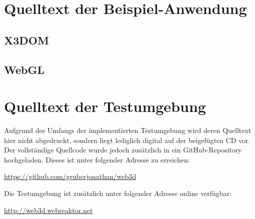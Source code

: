 \chapter{Quelltext der Beispiel-Anwendung}

\section{X3DOM}
\label{APPENDIX:X3DOM_EXAMPLE}

\section{WebGL}
\label{APPENDIX:WEBGL_EXAMPLE}

\chapter{Quelltext der Testumgebung}

Aufgrund des Umfangs der implementierten Testumgebung wird deren Quelltext hier nicht abgedruckt, sondern liegt lediglich digital auf der beigefügten CD vor.
Der vollständige Quellcode wurde jedoch zusätzlich in ein GitHub-Repository hochgeladen. Dieses ist unter folgender Adresse zu erreichen:

\url{https://github.com/gruberjonathan/web3d}

Die Testumgebung ist zusätzlich unter folgender Adresse online verfügbar:

\url{http://web3d.webreaktor.net}
